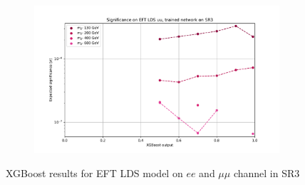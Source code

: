 \documentclass[12pt, a4paper]{book}
\begin{document}
\begin{figure}[!ht]
\begin{subfigure}[b]{0.49\textwidth}
   \end{subfigure}
   \hfill
   \begin{subfigure}[b]{0.49\textwidth}
      \centering
      \includegraphics[width=1\textwidth]{XGBoost/Model_independent/150/EFT_LDS/EXP_SIG_uu.pdf}
   \end{subfigure}
   \caption{XGBoost results for EFT LDS model on $ee$ and $\mu\mu$ channel in SR3}\label{fig:EFT_LDS_SR3}
\end{figure}
\end{document}
